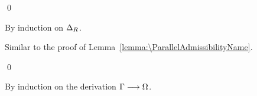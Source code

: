 \qed

\begin{lemma}[\ParallelExtensionSolutionName]\leavevmode
  \label{lemma:\ParallelExtensionSolutionName}
  \ParallelExtensionSolutionBody
\end{lemma}

\proof

By induction on $\Delta_R$.

Similar to the proof of
Lemma~\ref{lemma:\ParallelAdmissibilityName}.

\qed

\begin{lemma}[\StabilityOfCompleteContextsName]
  \label{lemma:\StabilityOfCompleteContextsName}
  \StabilityOfCompleteContextsBody
\end{lemma}

\proof

By induction on the derivation $\Gamma \longrightarrow \Omega$.

